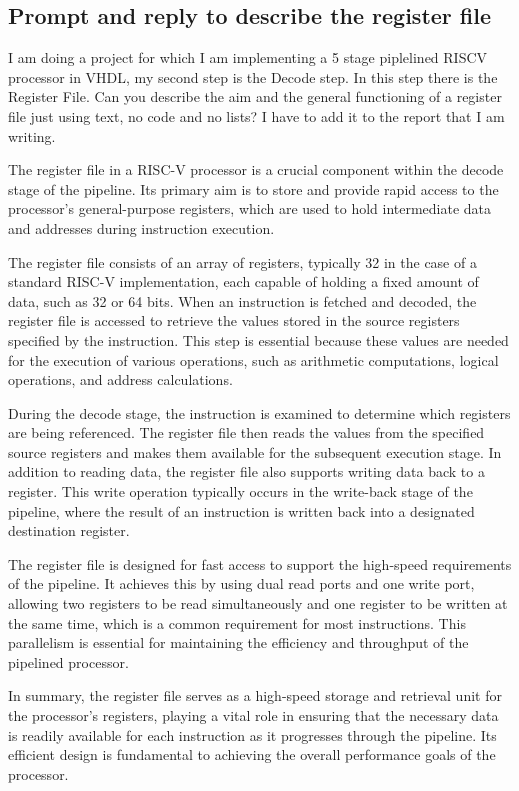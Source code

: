 \documentclass{article}
\begin{document}
\subsection{Prompt and reply to describe the register file}\label{prompt:regfile}
\begin{itshape}
I am doing a project for which I am implementing a 5 stage piplelined RISCV processor in VHDL, my
second step is the Decode step. In this step there is the Register File. Can you describe the aim and
the general functioning of a register file just using text, no code and no lists? I have to add it to
the report that I am writing.
\end{itshape}

\begin{spverbatim}
The register file in a RISC-V processor is a crucial component within the decode stage of the pipeline. Its primary aim is to store and provide rapid access to the processor's general-purpose registers, which are used to hold intermediate data and addresses during instruction execution.

The register file consists of an array of registers, typically 32 in the case of a standard RISC-V implementation, each capable of holding a fixed amount of data, such as 32 or 64 bits. When an instruction is fetched and decoded, the register file is accessed to retrieve the values stored in the source registers specified by the instruction. This step is essential because these values are needed for the execution of various operations, such as arithmetic computations, logical operations, and address calculations.

During the decode stage, the instruction is examined to determine which registers are being referenced. The register file then reads the values from the specified source registers and makes them available for the subsequent execution stage. In addition to reading data, the register file also supports writing data back to a register. This write operation typically occurs in the write-back stage of the pipeline, where the result of an instruction is written back into a designated destination register.

The register file is designed for fast access to support the high-speed requirements of the pipeline. It achieves this by using dual read ports and one write port, allowing two registers to be read simultaneously and one register to be written at the same time, which is a common requirement for most instructions. This parallelism is essential for maintaining the efficiency and throughput of the pipelined processor.

In summary, the register file serves as a high-speed storage and retrieval unit for the processor's registers, playing a vital role in ensuring that the necessary data is readily available for each instruction as it progresses through the pipeline. Its efficient design is fundamental to achieving the overall performance goals of the processor.
\end{spverbatim}
\end{document}
